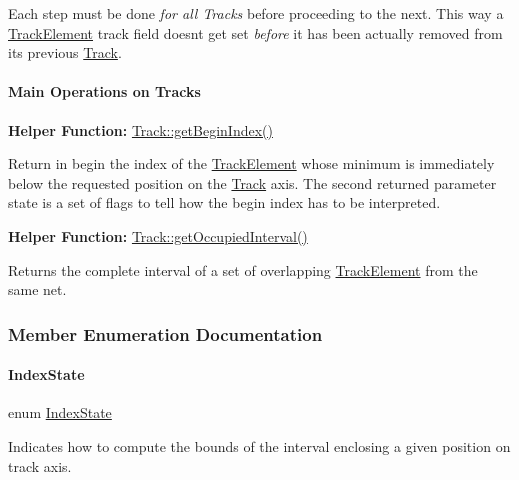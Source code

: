 Each step must be done {\itshape for all Tracks} before proceeding to the next. This way a \hyperlink{classKite_1_1TrackElement}{Track\+Element} {\ttfamily track} field doesn\textquotesingle{}t get set {\itshape before} it has been actually removed from it\textquotesingle{}s previous \hyperlink{classKite_1_1Track}{Track}.\hypertarget{classKite_1_1Track_ssecTrackOperations}{}\paragraph{Main Operations on Tracks}\label{classKite_1_1Track_ssecTrackOperations}
{\bfseries Helper Function\+:} \hyperlink{classKite_1_1Track_a33a6c0eebb0d4d50f639ae49a4d6252f}{Track\+::get\+Begin\+Index()}

Return in {\ttfamily begin} the index of the \hyperlink{classKite_1_1TrackElement}{Track\+Element} whose minimum is immediately below the requested {\ttfamily position} on the \hyperlink{classKite_1_1Track}{Track} axis. The second returned parameter {\ttfamily state} is a set of flags to tell how the {\ttfamily begin} index has to be interpreted.

{\bfseries Helper Function\+:} \hyperlink{classKite_1_1Track_ae87a2e7c9632b60737162295542e3e93}{Track\+::get\+Occupied\+Interval()}

Returns the complete interval of a set of overlapping \hyperlink{classKite_1_1TrackElement}{Track\+Element} from the same net. 

\subsubsection{Member Enumeration Documentation}
\mbox{\label{classKite_1_1Track_af4bdc8469c0fee386fc2ff30e0666bca}} 
\paragraph{\texorpdfstring{Index\+State}{IndexState}}
{\footnotesize\ttfamily enum \hyperlink{classKite_1_1Track_af4bdc8469c0fee386fc2ff30e0666bca}{Index\+State}}

Indicates how to compute the bounds of the interval enclosing a given {\ttfamily position} on track axis.

